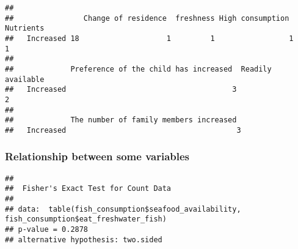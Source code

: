 \documentclass[
]{article}
\newenvironment{Shaded}{\begin{snugshade}}{\end{snugshade}}
\newcommand{\DocumentationTok}[1]{\textcolor[rgb]{0.56,0.35,0.01}{\textbf{\textit{#1}}}}
\newcommand{\FunctionTok}[1]{\textcolor[rgb]{0.13,0.29,0.53}{\textbf{#1}}}
\newcommand{\NormalTok}[1]{#1}
\newcommand{\OtherTok}[1]{\textcolor[rgb]{0.56,0.35,0.01}{#1}}
\newcommand{\SpecialCharTok}[1]{\textcolor[rgb]{0.81,0.36,0.00}{\textbf{#1}}}
\begin{document}
\begin{Shaded}
\end{Shaded}

\begin{verbatim}
##            
##                Change of residence  freshness High consumption  Nutrients
##   Increased 18                    1         1                 1         1
##            
##             Preference of the child has increased  Readily available 
##   Increased                                      3                  2
##            
##             The number of family members increased 
##   Increased                                       3
\end{verbatim}

\hypertarget{relationship-between-some-variables}{%
\subsubsection{Relationship between some
variables}\label{relationship-between-some-variables}}

\begin{Shaded}
\end{Shaded}

\begin{verbatim}
## 
##  Fisher's Exact Test for Count Data
## 
## data:  table(fish_consumption$seafood_availability, fish_consumption$eat_freshwater_fish)
## p-value = 0.2878
## alternative hypothesis: two.sided
\end{verbatim}

\begin{Shaded}
\end{Shaded}
\end{document}
